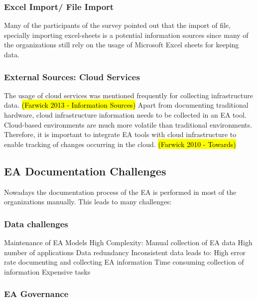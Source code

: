 \subsubsection{Excel Import/ File Import}
Many of the participants of the survey pointed out that the import of file, specially importing excel-sheets is a potential information sources since many of the organizations still rely on the usage of Microsoft Excel sheets for keeping data.

\subsubsection{External Sources: Cloud Services}

The usage of cloud services was mentioned frequently for collecting infrastructure data. \hl{(Farwick 2013 - Information Sources)} Apart from documenting traditional hardware, cloud infrastructure information needs to be collected in an EA tool. Cloud-based environments are much more volatile than traditional environments. Therefore, it is important to integrate EA tools with cloud infrastructure to enable tracking of changes occurring in the cloud. \hl{(Farwick 2010 - Towards)}


\subsection{EA Documentation Challenges}

Nowadays the documentation process of the EA is performed in most of the organizations manually. This leads to many challenges:

\subsubsection{Data challenges}

Maintenance of EA Models
High Complexity: Manual collection of EA data
High number of applications
Data redundancy
Inconsistent data
leads to: High error rate documenting and collecting EA information
Time consuming collection of information
Expensive tasks

\subsubsection{EA Governance}


